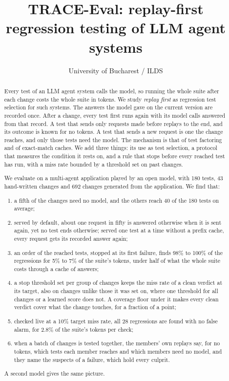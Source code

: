 \documentclass[11pt,a4paper]{article}
\title{TRACE-Eval: replay-first regression testing of LLM agent systems}
\author{University of Bucharest / ILDS}
\date{}
\begin{document}
\maketitle

\begin{abstract}
Every test of an LLM agent system calls the model, so running the whole suite after each change costs the whole
suite in tokens. We study \emph{replay first} as regression test selection for such systems. The answers the model
gave on the current version are recorded once. After a change, every test first runs again with its model calls
answered from that record. A test that sends only requests made before replays to the end, and its outcome is
known for no tokens. A test that sends a new request is one the change reaches, and only those tests need the
model. The mechanism is that of test factoring and of exact-match caches. We add three things: its use as test
selection, a protocol that measures the condition it rests on, and a rule that stops before every reached test has
run, with a miss rate bounded by a threshold set on past changes.

We evaluate on a multi-agent application played by an open model, with 180 tests, 43 hand-written changes and 692
changes generated from the application. We find that:
\begin{enumerate}[label=(\roman*), leftmargin=2.2em]
  \item a fifth of the changes need no model, and the others reach 40 of the 180 tests on average;
  \item served by default, about one request in fifty is answered otherwise when it is sent again, yet no test
        ends otherwise; served one test at a time without a prefix cache, every request gets its recorded answer
        again;
  \item an order of the reached tests, stopped at its first failure, finds 98\% to 100\% of the regressions for
        5\% to 7\% of the suite's tokens, under half of what the whole suite costs through a cache of answers;
  \item a stop threshold set per group of changes keeps the miss rate of a clean verdict at its target, also on
        changes unlike those it was set on, where one threshold for all changes or a learned score does not. A
        coverage floor under it makes every clean verdict cover what the change touches, for a fraction of a
        point;
  \item checked live at a 10\% target miss rate, all 28 regressions are found with no false alarm, for 2.8\% of
        the suite's tokens per check;
  \item when a batch of changes is tested together, the members' own replays say, for no tokens, which tests each
        member reaches and which members need no model, and they name the suspects of a failure, which hold every
        culprit.
\end{enumerate}
A second model gives the same picture.
\end{abstract}
\end{document}
